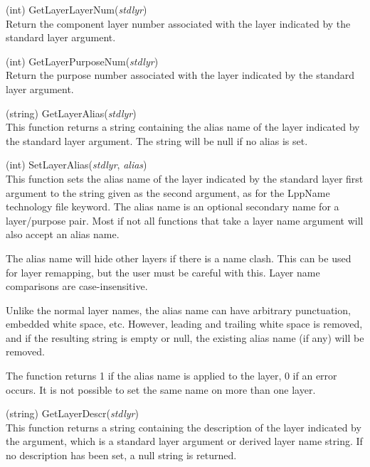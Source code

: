 \begin{description}
\item{(int) \vt GetLayerLayerNum({\it stdlyr\/})}\\
Return the component layer number associated with the layer indicated
by the standard layer argument.

\item{(int) \vt GetLayerPurposeNum({\it stdlyr\/})}\\
Return the purpose number associated with the layer indicated by the
standard layer argument.

\item{(string) \vt GetLayerAlias({\it stdlyr\/})}\\
This function returns a string containing the alias name of the layer
indicated by the standard layer argument.  The string will be null if
no alias is set.

\item{(int) \vt SetLayerAlias({\it stdlyr\/}, {\it alias\/})}\\
This function sets the alias name of the layer indicated by the
standard layer first argument to the string given as the second
argument, as for the {\vt LppName} technology file keyword.  The alias
name is an optional secondary name for a layer/purpose pair.  Most if
not all functions that take a layer name argument will also accept an
alias name.

The alias name will hide other layers if there is a name clash.  This
can be used for layer remapping, but the user must be careful with
this.  Layer name comparisons are case-insensitive.

Unlike the normal layer names, the alias name can have arbitrary
punctuation, embedded white space, etc.  However, leading and trailing
white space is removed, and if the resulting string is empty or null,
the existing alias name (if any) will be removed.

The function returns 1 if the alias name is applied to the layer, 0 if
an error occurs.  It is not possible to set the same name on more than
one layer.

\item{(string) \vt GetLayerDescr({\it stdlyr\/})}\\
This function returns a string containing the description of the layer
indicated by the argument, which is a standard layer argument or
derived layer name string.  If no description has been set, a null
string is returned.


\end{description}
